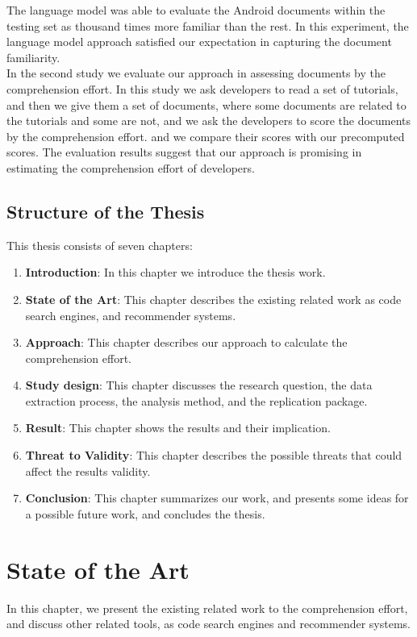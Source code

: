 \documentclass[12pt,mscthesis]{usiinfthesis}
\begin{document}
	 The language model was able to evaluate the Android documents within the testing set as thousand times more familiar than the rest. 
	 In this experiment, the language model approach satisfied our expectation in capturing the document familiarity.\\

	 In the second study we evaluate our approach in assessing documents by the comprehension effort. In this study we ask developers to read a set of tutorials, and then we give them a set of documents, where some documents are related to the tutorials and some are not, and we ask the developers to score the documents by the comprehension effort. and we compare their scores with our precomputed scores. The evaluation results suggest that our approach is promising in estimating the comprehension effort of developers. 


	\section{Structure of the Thesis}
	This thesis consists of seven chapters: 
	\begin{enumerate}
	
		\item \textbf{Introduction}: In this chapter we introduce the thesis work.
		\item \textbf{State of the Art}: This chapter describes the existing related work as code search engines, and recommender systems.
		\item \textbf{Approach}: This chapter describes our approach to calculate the comprehension effort.
		\item \textbf{Study design}: This chapter discusses the research question, the data extraction process, the analysis method, and the replication package.
		\item \textbf{Result}: This chapter shows the results and their implication.
		\item \textbf{Threat to Validity}: This chapter describes the possible threats that could affect the results validity.
		\item \textbf{Conclusion}: This chapter summarizes our work, and presents some ideas for a possible future work, and concludes the thesis.
	\end{enumerate}
\chapter{State of the Art}
	In this chapter, we present the existing related work to the comprehension effort, and discuss other related tools, as code search engines and recommender systems.
\end{document}
